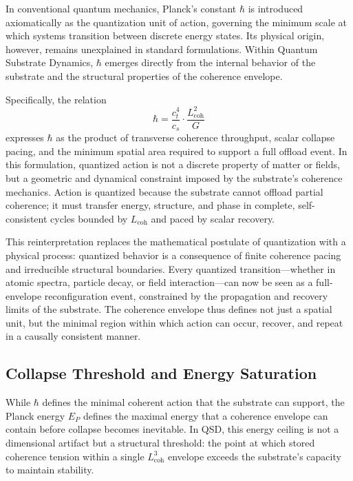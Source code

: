 \documentclass[entropy,article,submit,pdftex,moreauthors]{Definitions/mdpi}
\begin{document}
In conventional quantum mechanics, Planck’s constant \texorpdfstring{\( \hbar \)}{hbar} is introduced axiomatically as the quantization unit of action, governing the minimum scale at which systems transition between discrete energy states. Its physical origin, however, remains unexplained in standard formulations. Within Quantum Substrate Dynamics, \texorpdfstring{\( \hbar \)}{hbar} emerges directly from the internal behavior of the substrate and the structural properties of the coherence envelope.

Specifically, the relation
\[
\hbar = \frac{c_t^4}{c_s} \cdot \frac{L_{\text{coh}}^2}{G}
\]
expresses \texorpdfstring{\( \hbar \)}{hbar} as the product of transverse coherence throughput, scalar collapse pacing, and the minimum spatial area required to support a full offload event. In this formulation, quantized action is not a discrete property of matter or fields, but a geometric and dynamical constraint imposed by the substrate’s coherence mechanics. Action is quantized because the substrate cannot offload partial coherence; it must transfer energy, structure, and phase in complete, self-consistent cycles bounded by \texorpdfstring{\( L_{\text{coh}} \)}{Lcoh} and paced by scalar recovery.

This reinterpretation replaces the mathematical postulate of quantization with a physical process: quantized behavior is a consequence of finite coherence pacing and irreducible structural boundaries. Every quantized transition—whether in atomic spectra, particle decay, or field interaction—can now be seen as a full-envelope reconfiguration event, constrained by the propagation and recovery limits of the substrate. The coherence envelope thus defines not just a spatial unit, but the minimal region within which action can occur, recover, and repeat in a causally consistent manner.
\subsection{Collapse Threshold and Energy Saturation}

While \texorpdfstring{\( \hbar \)}{hbar} defines the minimal coherent action that the substrate can support, the Planck energy \texorpdfstring{\( E_P \)}{Ep} defines the maximal energy that a coherence envelope can contain before collapse becomes inevitable. In QSD, this energy ceiling is not a dimensional artifact but a structural threshold: the point at which stored coherence tension within a single \texorpdfstring{\( L_{\text{coh}}^3 \)}{Lcoh\^{}3} envelope exceeds the substrate’s capacity to maintain stability.
\end{document}
